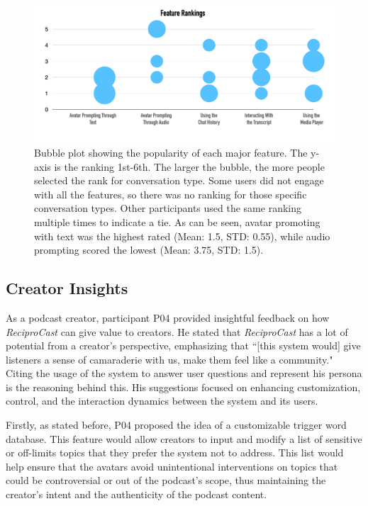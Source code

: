 \documentclass[12pt]{report}
\begin{document}
\begin{myfont}
        \begin{figure}[H]
        \centering
          \includegraphics[width=1\textwidth]{figures/featurerank.png}
          \caption{Bubble plot showing the popularity of each major feature. The y-axis is the ranking 1st-6th. The larger the bubble, the more people selected the rank for conversation type. Some users did not engage with all the features, so there was no ranking for those specific conversation types. Other participants used the same ranking multiple times to indicate a tie. As can be seen, avatar promoting with text was the highest rated (Mean: 1.5, STD: 0.55), while audio prompting scored the lowest (Mean: 3.75, STD: 1.5).}
          \label{fig:featurerank}
        \end{figure}
        
        \subsection{Creator Insights}
        As a podcast creator, participant P04 provided insightful feedback on how \textit{ReciproCast} can give value to creators. He stated that \textit{ReciproCast} has a lot of potential from a creator's perspective, emphasizing that “[this system would] give listeners a sense of camaraderie with us, make them feel like a community." Citing the usage of the system to answer user questions and represent his persona is the reasoning behind this. His suggestions focused on enhancing customization, control, and the interaction dynamics between the system and its users.
        
        \indent Firstly, as stated before, P04 proposed the idea of a customizable trigger word database. This feature would allow creators to input and modify a list of sensitive or off-limits topics that they prefer the system not to address. This list would help ensure that the avatars avoid unintentional interventions on topics that could be controversial or out of the podcast's scope, thus maintaining the creator's intent and the authenticity of the podcast content.


\end{myfont}
\end{document}
